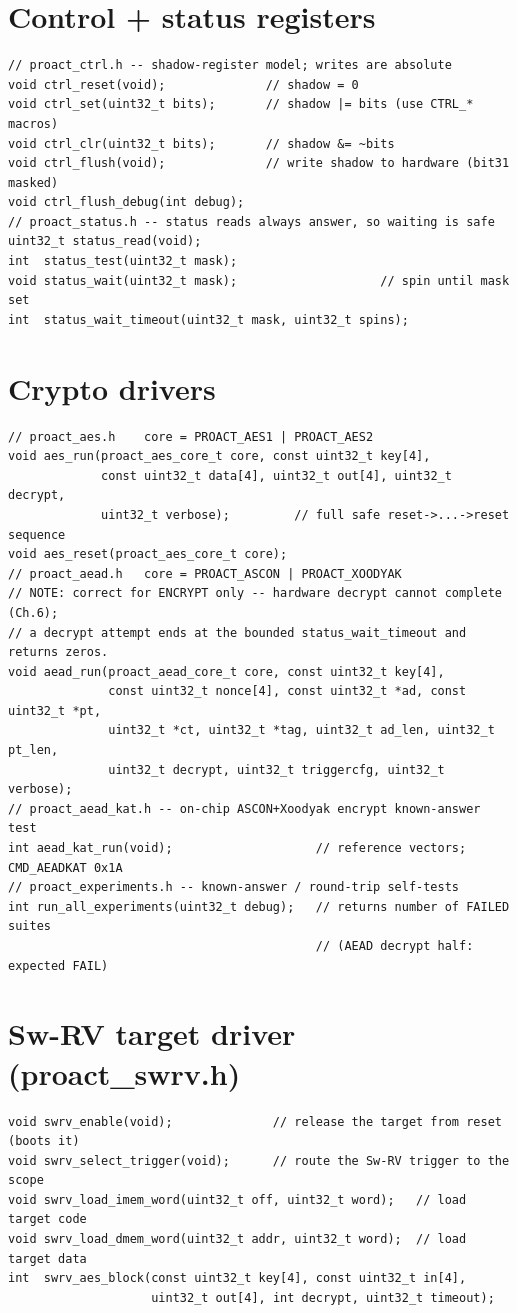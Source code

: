 \documentclass[11pt,a4paper]{report}
\newcommand{\code}[1]{{\ttfamily\small #1}}
\begin{document}
\section{Control + status registers}
\begin{lstlisting}[style=c]
// proact_ctrl.h -- shadow-register model; writes are absolute
void ctrl_reset(void);              // shadow = 0
void ctrl_set(uint32_t bits);       // shadow |= bits (use CTRL_* macros)
void ctrl_clr(uint32_t bits);       // shadow &= ~bits
void ctrl_flush(void);              // write shadow to hardware (bit31 masked)
void ctrl_flush_debug(int debug);
// proact_status.h -- status reads always answer, so waiting is safe
uint32_t status_read(void);
int  status_test(uint32_t mask);
void status_wait(uint32_t mask);                    // spin until mask set
int  status_wait_timeout(uint32_t mask, uint32_t spins);
\end{lstlisting}

\section{Crypto drivers}
\begin{lstlisting}[style=c]
// proact_aes.h    core = PROACT_AES1 | PROACT_AES2
void aes_run(proact_aes_core_t core, const uint32_t key[4],
             const uint32_t data[4], uint32_t out[4], uint32_t decrypt,
             uint32_t verbose);         // full safe reset->...->reset sequence
void aes_reset(proact_aes_core_t core);
// proact_aead.h   core = PROACT_ASCON | PROACT_XOODYAK
// NOTE: correct for ENCRYPT only -- hardware decrypt cannot complete (Ch.6);
// a decrypt attempt ends at the bounded status_wait_timeout and returns zeros.
void aead_run(proact_aead_core_t core, const uint32_t key[4],
              const uint32_t nonce[4], const uint32_t *ad, const uint32_t *pt,
              uint32_t *ct, uint32_t *tag, uint32_t ad_len, uint32_t pt_len,
              uint32_t decrypt, uint32_t triggercfg, uint32_t verbose);
// proact_aead_kat.h -- on-chip ASCON+Xoodyak encrypt known-answer test
int aead_kat_run(void);                    // reference vectors; CMD_AEADKAT 0x1A
// proact_experiments.h -- known-answer / round-trip self-tests
int run_all_experiments(uint32_t debug);   // returns number of FAILED suites
                                           // (AEAD decrypt half: expected FAIL)
\end{lstlisting}

\section{Sw-RV target driver (\code{proact\_swrv.h})}
\begin{lstlisting}[style=c]
void swrv_enable(void);              // release the target from reset (boots it)
void swrv_select_trigger(void);      // route the Sw-RV trigger to the scope
void swrv_load_imem_word(uint32_t off, uint32_t word);   // load target code
void swrv_load_dmem_word(uint32_t addr, uint32_t word);  // load target data
int  swrv_aes_block(const uint32_t key[4], const uint32_t in[4],
                    uint32_t out[4], int decrypt, uint32_t timeout);
\end{lstlisting}
\end{document}
